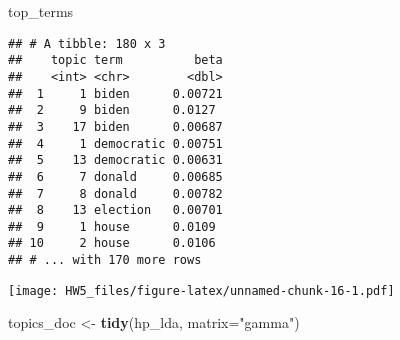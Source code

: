 \documentclass[
]{article}
\newenvironment{Shaded}{\begin{snugshade}}{\end{snugshade}}
\newcommand{\CommentTok}[1]{\textcolor[rgb]{0.56,0.35,0.01}{\textit{#1}}}
\newcommand{\DataTypeTok}[1]{\textcolor[rgb]{0.13,0.29,0.53}{#1}}
\newcommand{\KeywordTok}[1]{\textcolor[rgb]{0.13,0.29,0.53}{\textbf{#1}}}
\newcommand{\NormalTok}[1]{#1}
\newcommand{\OperatorTok}[1]{\textcolor[rgb]{0.81,0.36,0.00}{\textbf{#1}}}
\newcommand{\OtherTok}[1]{\textcolor[rgb]{0.56,0.35,0.01}{#1}}
\newcommand{\StringTok}[1]{\textcolor[rgb]{0.31,0.60,0.02}{#1}}
\begin{document}
\begin{Shaded}
\begin{Highlighting}[]
\NormalTok{top_terms}
\end{Highlighting}
\end{Shaded}

\begin{verbatim}
## # A tibble: 180 x 3
##    topic term          beta
##    <int> <chr>        <dbl>
##  1     1 biden      0.00721
##  2     9 biden      0.0127 
##  3    17 biden      0.00687
##  4     1 democratic 0.00751
##  5    13 democratic 0.00631
##  6     7 donald     0.00685
##  7     8 donald     0.00782
##  8    13 election   0.00701
##  9     1 house      0.0109 
## 10     2 house      0.0106 
## # ... with 170 more rows
\end{verbatim}

\begin{Shaded}
\end{Shaded}

\texttt{[image: HW5\_files/figure-latex/unnamed-chunk-16-1.pdf]}

\begin{Shaded}
\begin{Highlighting}[]
\NormalTok{topics_doc <-}\StringTok{ }\KeywordTok{tidy}\NormalTok{(hp_lda, }\DataTypeTok{matrix=}\StringTok{"gamma"}\NormalTok{) }
\end{Highlighting}
\end{Shaded}

\begin{Shaded}
\end{Shaded}
\end{document}
